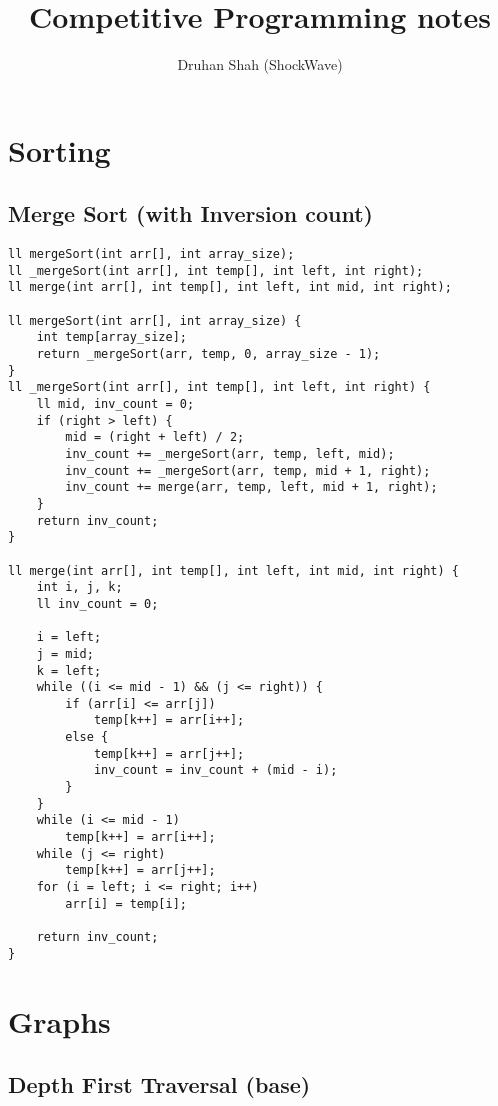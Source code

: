 \documentclass{article}
\author{Druhan Shah (ShockWave)}
\title{Competitive Programming notes}
\begin{document}
    \maketitle
    \tableofcontents
    \section{Sorting}
        \subsection{Merge Sort (with Inversion count)}


        \begin{lstlisting}
ll mergeSort(int arr[], int array_size);
ll _mergeSort(int arr[], int temp[], int left, int right);
ll merge(int arr[], int temp[], int left, int mid, int right);

ll mergeSort(int arr[], int array_size) {
    int temp[array_size];
    return _mergeSort(arr, temp, 0, array_size - 1);
}
ll _mergeSort(int arr[], int temp[], int left, int right) {
    ll mid, inv_count = 0;
    if (right > left) {
        mid = (right + left) / 2;
        inv_count += _mergeSort(arr, temp, left, mid);
        inv_count += _mergeSort(arr, temp, mid + 1, right);
        inv_count += merge(arr, temp, left, mid + 1, right);
    }
    return inv_count;
}

ll merge(int arr[], int temp[], int left, int mid, int right) {
    int i, j, k;
    ll inv_count = 0;

    i = left;
    j = mid;
    k = left;
    while ((i <= mid - 1) && (j <= right)) {
        if (arr[i] <= arr[j])
            temp[k++] = arr[i++];
        else {
            temp[k++] = arr[j++];
            inv_count = inv_count + (mid - i);
        }
    }
    while (i <= mid - 1)
        temp[k++] = arr[i++];
    while (j <= right)
        temp[k++] = arr[j++];
    for (i = left; i <= right; i++)
        arr[i] = temp[i];

    return inv_count;
}       \end{lstlisting}


    \section{Graphs}
        \subsection{Depth First Traversal (base)}
\end{document}
